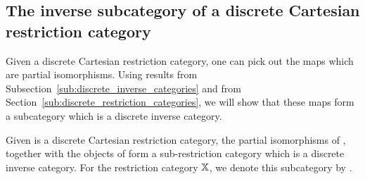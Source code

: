 \subsection{The inverse subcategory of a discrete Cartesian restriction category } %
\label{sub:the_inverse_subcategory_of_a_discrete_restriction_category}

Given a discrete Cartesian restriction category, one can pick out the maps which are partial isomorphisms.
Using results from Subsection~\ref{sub:discrete_inverse_categories} and from
Section~\ref{sub:discrete_restriction_categories}, we will show that these maps form a
subcategory which is a discrete inverse category.

\begin{proposition}\label{lem:inv_x_is_a_discrete_inverse_category}
  Given \X is a discrete Cartesian restriction category, the partial isomorphisms of \X, together
  with the objects of \X form a sub-restriction category which is a discrete inverse category. For
  the restriction category $\mathbb{X}$, we denote this subcategory by \Inv{\X}.
\end{proposition}
